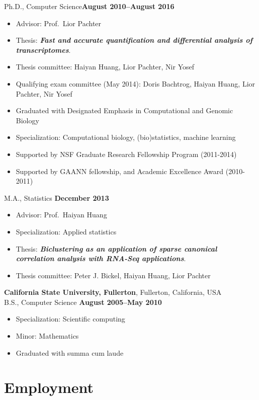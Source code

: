 \documentclass[11pt,notitlepage]{article} %
\begin{document}
Ph.D., Computer Science\hfill {\bf August 2010--August 2016}
\begin{itemize}[noitemsep,topsep=0pt]
\item Advisor: Prof.\ Lior Pachter
\item Thesis: \textit{\textbf{Fast and accurate quantification and differential analysis of transcriptomes}}.
\item Thesis committee: Haiyan Huang, Lior Pachter, Nir Yosef
\item Qualifying exam committee (May 2014): Doris Bachtrog, Haiyan Huang, Lior Pachter, Nir Yosef
\item Graduated with Designated Emphasis in Computational and Genomic Biology
\item Specialization: Computational biology, (bio)statistics, machine learning
\item Supported by NSF Graduate Research Fellowship Program (2011-2014)
\item Supported by GAANN fellowship, and Academic Excellence Award (2010-2011)
\end{itemize}

\bigskip

M.A., Statistics \hfill {\bf December 2013}
\begin{itemize}[noitemsep,topsep=0pt]
\item Advisor: Prof.\ Haiyan Huang
\item Specialization: Applied statistics
\item Thesis: \textit{\textbf{Biclustering as an application of sparse canonical correlation analysis with RNA-Seq applications}}.
\item Thesis committee: Peter J. Bickel, Haiyan Huang, Lior Pachter
\end{itemize}

\bigskip

{\bf California State University, Fullerton}, Fullerton, California, USA\\
B.S., Computer Science \hfill {\bf August 2005--May 2010}
\begin{itemize}[noitemsep,topsep=0pt]
\item Specialization: Scientific computing
\item Minor: Mathematics
\item Graduated with summa cum laude
\end{itemize}

\bigskip
\section*{Employment}
\end{document}
